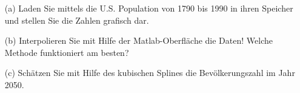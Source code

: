 \begin{aufg}[0]
\begin{itemize}
\item [(a)] Laden Sie mittels  die
  U.S. Population  von  1790 bis 1990 in ihren Speicher und stellen Sie die Zahlen grafisch
  dar.
\item[(b)] Interpolieren Sie mit Hilfe der Matlab-Oberfläche die Daten!
  Welche Methode funktioniert am besten?
\item [(c)] Schätzen Sie mit Hilfe des kubischen Splines die
  Bevölkerungszahl im Jahr 2050.
\end{itemize}
\end{aufg}